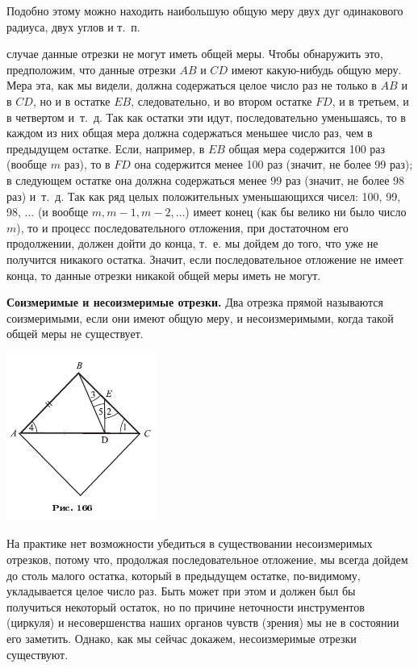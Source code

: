 \documentclass[oneside]{book}
\begin{document}
Подобно этому можно находить наибольшую общую меру двух дуг одинакового радиуса, двух углов и т.~п.

 случае данные отрезки не могут иметь общей меры.
Чтобы обнаружить это, предположим, что данные отрезки $AB$ и $CD$ имеют какую-нибудь общую меру.
Мера эта, как мы видели, должна содержаться целое число раз не только в $AB$ и в $CD$, но и в остатке $EB$, следовательно, и во втором остатке $FD$, и в третьем, и в четвертом и~т.~д.
Так как остатки эти идут, последовательно уменьшаясь, то в каждом из них общая мера должна содержаться меньшее число раз, чем в предыдущем остатке.
Если, например, в $EB$ общая мера содержится 100 раз (вообще $m$ раз), то в $FD$ она содержится менее 100 раз (значит, не более 99 раз);
в следующем остатке она должна содержаться менее 99 раз (значит, не более 98 раз) и~т.~д.
Так как ряд целых положительных уменьшающихся чисел:
100, 99, 98, ...
(и вообще $m, m-1, m-2,\dots$) имеет конец (как бы велико ни было число $m$), то и процесс последовательного отложения, при достаточном его продолжении, должен дойти до конца, т.~е. мы дойдем до того, что уже не получится никакого остатка.
Значит, если последовательное отложение не имеет конца, то данные отрезки никакой общей меры иметь не могут.

\textbf{Соизмеримые и несоизмеримые отрезки.}
Два отрезка прямой называются соизмеримыми, если они имеют общую меру, и несоизмеримыми, когда такой общей меры не существует.

\includegraphics{pics/ris-166}

На практике нет возможности убедиться в существовании несоизмеримых отрезков, потому что, продолжая последовательное отложение, мы всегда дойдем до столь малого остатка, который в предыдущем остатке, по-видимому, укладывается целое число раз.
Быть может при этом и должен был бы получиться некоторый остаток, но по причине неточности инструментов (циркуля) и несовершенства наших органов чувств (зрения) мы не в состоянии его заметить.
Однако, как мы сейчас докажем, несоизмеримые отрезки существуют.
\end{document}
